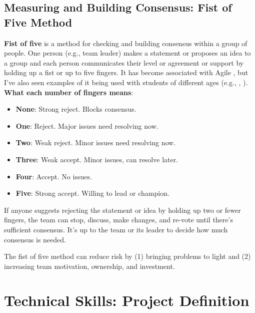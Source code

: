 \marginpar{\fistOfFiveDef}
\subsection{Measuring and Building Consensus: Fist of Five Method}
\textbf{Fist of five} is a method for checking and building consensus within a group of people. One person (e.g., team leader) makes a statement or proposes an idea to a group and each person communicates their level or agreement or support by holding up a fist or up to five fingers. It has become associated with Agile \parencite{belling2020agile}, but I've also seen examples of it being used with students of different ages (e.g., \parencite{fletcher2002firestarter}, \parencite{hulshult2019using}). \textbf{What each number of fingers means}:

\begin{itemize}
    \item \textbf{None}: Strong reject. Blocks consensus.
    \item \textbf{One}: Reject. Major issues need resolving now.
    \item \textbf{Two}: Weak reject. Minor issues need resolving now.
    \item \textbf{Three}: Weak accept. Minor issues, can resolve later.
    \item \textbf{Four}: Accept. No issues.
    \item \textbf{Five}: Strong accept. Willing to lead or champion.
\end{itemize}

If anyone suggests rejecting the statement or idea by holding up two or fewer fingers, the team can stop, discuss, make changes, and re-vote until there's sufficient consensus. It's up to the team or its leader to decide how much consensus is needed.

The fist of five method can reduce risk by (1) bringing problems to light and (2) increasing team motivation, ownership, and investment.

\section{Technical Skills: Project Definition}

